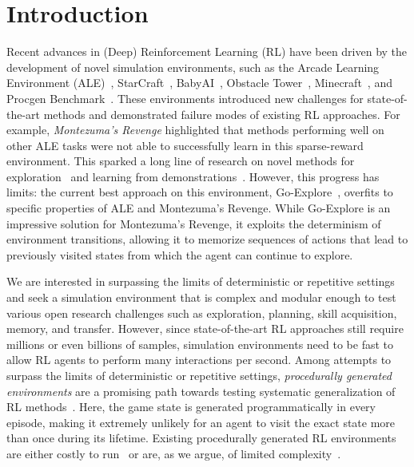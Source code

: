 \documentclass{article}
\begin{document}
\section{Introduction}
Recent advances in (Deep) Reinforcement Learning (RL) have been driven
by the development of novel simulation environments, such as the
Arcade Learning Environment (ALE)~\citep{DBLP:journals/jair/BellemareNVB13},
StarCraft~\citep{synnaeve2016torchcraft, vinyals2017starcraft},
BabyAI~\citep{chevalier2018babyai}, Obstacle
Tower~\citep{DBLP:conf/ijcai/JulianiKBHTHCTL19}, Minecraft~\citep{DBLP:conf/ijcai/JohnsonHHB16, guss2019minerlcomp, DBLP:journals/corr/abs-1905-01978}, and Procgen Benchmark~\citep{cobbe2019procgen}.  These environments
introduced new challenges for state-of-the-art methods and
demonstrated failure modes of existing RL approaches.
For example, \emph{Montezuma's Revenge} highlighted that methods performing well on other ALE tasks were not able to successfully learn in this sparse-reward environment.
This sparked a long line of research on
novel methods for exploration~\citep[e.g.,][]{bellemare2016unifying,
  tang2017exploration, ostrovski2017count} and learning from
demonstrations~\citep[e.g.,][]{Hester2017DeepQF,
  DBLP:journals/corr/abs-1812-03381,DBLP:conf/nips/AytarPBP0F18}.
However, this progress has limits: the current best approach on this
environment, Go-Explore~\citep{ecoffet2019go,DBLP:journals/corr/abs-2004-12919}, overfits to specific
properties of ALE and Montezuma's Revenge.
While Go-Explore is an impressive solution for Montezuma's Revenge, it exploits
the determinism of environment transitions, allowing it to memorize sequences of actions that lead to previously visited states from which the agent can continue to explore.

We are interested in surpassing the limits of deterministic or repetitive settings and seek a simulation environment that is complex and modular enough to test various open research
challenges such as exploration, planning, skill acquisition, memory, and transfer. However, since state-of-the-art RL approaches still require millions or even billions of samples, simulation
environments need to be fast to allow RL agents to perform many interactions per second.
Among attempts to surpass the limits of deterministic or repetitive
settings, \emph{procedurally generated environments} are a promising
path towards testing systematic generalization of RL
methods~\citep[e.g.,][]{justesen2018illuminating,DBLP:conf/ijcai/JulianiKBHTHCTL19,DBLP:journals/corr/abs-1911-13071,cobbe2019procgen}. Here,
the game state is generated programmatically in every
episode, making it extremely unlikely for an agent to visit the exact
state more than once during its lifetime.  Existing procedurally generated RL environments
are either costly to
run~\citep[e.g.,][]{vinyals2017starcraft,DBLP:conf/ijcai/JohnsonHHB16,DBLP:conf/ijcai/JulianiKBHTHCTL19}
or are, as we argue, of limited complexity~\citep[e.g.,][]{gym_minigrid,DBLP:conf/icml/CobbeKHKS19,DBLP:journals/corr/BeattieLTWWKLGV16}.
\end{document}
